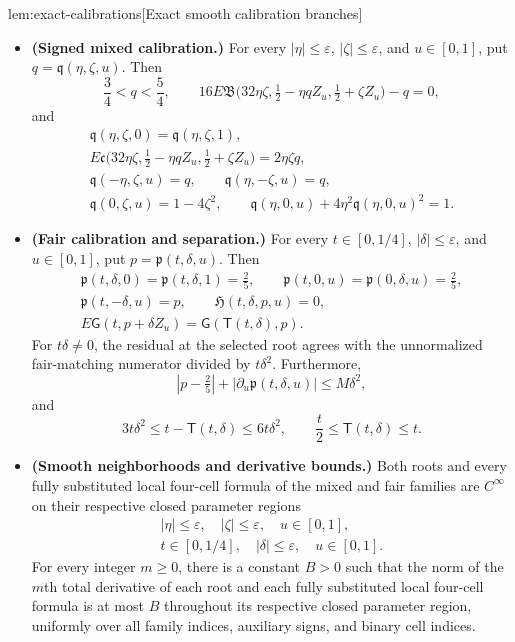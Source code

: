 \documentclass[11pt]{article}
\begin{document}
\begin{lemmav}{lem:exact-calibrations}[Exact smooth calibration branches]
\begin{itemize}
\item \textbf{(Signed mixed calibration.)}
For every \(|\eta|\le\varepsilon\), \(|\zeta|\le\varepsilon\), and \(u\in[0,1]\), put
\(q=\mathfrak q(\eta,\zeta,u)\). Then
\[
\frac34<q<\frac54,\qquad
16E\mathfrak B
 \bigl(32\eta\zeta,\tfrac12-\eta qZ_u,\tfrac12+\zeta Z_u\bigr)-q=0,
\]
and
\[
\begin{gathered}
\mathfrak q(\eta,\zeta,0)=\mathfrak q(\eta,\zeta,1),\\
E\mathfrak c
 \bigl(32\eta\zeta,\tfrac12-\eta qZ_u,\tfrac12+\zeta Z_u\bigr)
 =2\eta\zeta q,\\
\mathfrak q(-\eta,\zeta,u)=q,\qquad
\mathfrak q(\eta,-\zeta,u)=q,\\
\mathfrak q(0,\zeta,u)=1-4\zeta^2,\qquad
\mathfrak q(\eta,0,u)+4\eta^2\mathfrak q(\eta,0,u)^2=1.
\end{gathered}
\]

\item \textbf{(Fair calibration and separation.)}
For every \(t\in[0,1/4]\), \(|\delta|\le\varepsilon\), and \(u\in[0,1]\), put
\(p=\mathfrak p(t,\delta,u)\). Then
\[
\begin{gathered}
\mathfrak p(t,\delta,0)=\mathfrak p(t,\delta,1)=\frac25,\qquad
\mathfrak p(t,0,u)=\mathfrak p(0,\delta,u)=\frac25,\\
\mathfrak p(t,-\delta,u)=p,\qquad
\mathfrak H(t,\delta,p,u)=0,\\
E\mathsf G(t,p+\delta Z_u)=\mathsf G(\mathsf T(t,\delta),p).
\end{gathered}
\]
For \(t\delta\ne0\), the residual at the selected root agrees with the unnormalized fair-matching numerator divided by \(t\delta^2\). Furthermore,
\[
|p-\tfrac25|+|\partial_u\mathfrak p(t,\delta,u)|\le M\delta^2,
\]
and
\[
3t\delta^2\le t-\mathsf T(t,\delta)\le6t\delta^2,\qquad
\frac t2\le\mathsf T(t,\delta)\le t.
\]

\item \textbf{(Smooth neighborhoods and derivative bounds.)}
Both roots and every fully substituted local four-cell formula of the mixed and fair families are \(C^\infty\) on their respective closed parameter regions
\[
\begin{gathered}
|\eta|\le\varepsilon,\quad |\zeta|\le\varepsilon,\quad u\in[0,1],\\
t\in[0,1/4],\quad |\delta|\le\varepsilon,\quad u\in[0,1].
\end{gathered}
\]
For every integer \(m\ge0\), there is a constant \(B>0\) such that the norm of the \(m\)th total derivative of each root and each fully substituted local four-cell formula is at most \(B\) throughout its respective closed parameter region, uniformly over all family indices, auxiliary signs, and binary cell indices.


\end{itemize}
\end{lemmav}
\end{document}
